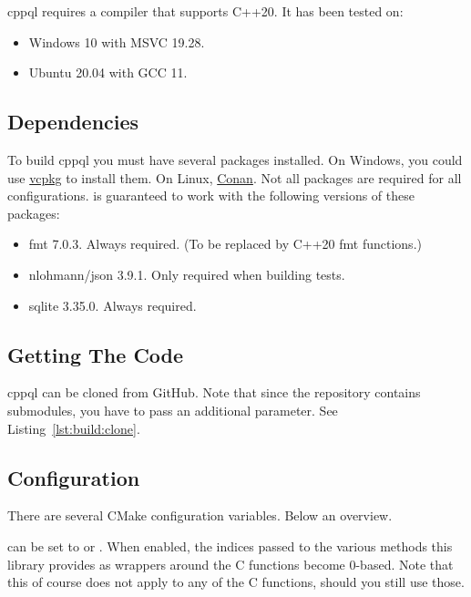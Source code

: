cppql requires a compiler that supports C++20. It has been tested on:

\begin{itemize}
	\item Windows 10 with MSVC 19.28.
	\item Ubuntu 20.04 with GCC 11.
\end{itemize}

\subsection{Dependencies}

To build \gls{cppql} you must have several packages installed. On Windows, you could use \href{https://github.com/microsoft/vcpkg}{vcpkg} to install them. On Linux, \href{https://conan.io}{Conan}. Not all packages are required for all configurations.  is guaranteed to work with the following versions of these packages:

\begin{itemize}
	\item fmt 7.0.3\cite{fmt}. Always required. (To be replaced by C++20 fmt functions.)
	\item nlohmann/json 3.9.1\cite{nlohmann}. Only required when building tests.
	\item sqlite 3.35.0\cite{sqlite}. Always required.
\end{itemize}

\subsection{Getting The Code}
\label{section:build:get}

\gls{cppql} can be cloned from GitHub. Note that since the repository contains submodules, you have to pass an additional parameter. See Listing~\ref{lst:build:clone}.



\subsection{Configuration}
\label{section:build:config}

There are several CMake configuration variables. Below an overview.

 can be set to  or . When enabled, the indices passed to the various  methods this library provides as wrappers around the C functions become 0-based. Note that this of course does not apply to any of the C functions, should you still use those.

